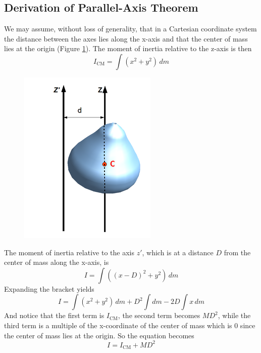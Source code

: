\subsection{Derivation of Parallel-Axis Theorem}
We may assume, without loss of generality, that in a Cartesian coordinate system the distance
between the axes lies along the x-axis and that the center of mass lies at the origin (Figure
\ref{fig:parallel-axis-theorem}). The moment of inertia relative to the z-axis is then
\[
    I_\text{CM}=\int(x^2+y^2)\,dm
\]
\begin{figure}[ht!]
    \centering
    \includegraphics[width=0.3 \textwidth]{../figures/parallel axis theorem.png}
    \caption{}
    \label{fig:parallel-axis-theorem}
\end{figure}
The moment of inertia relative to the axis $z'$, which is at a distance $D$ from the center of
mass along the x-axis, is
\[
    I=\int((x-D)^2+y^2)\,dm
\]
Expanding the bracket yields
\[
    I=\int(x^2+y^2)\,dm+D^2\int dm-2D\int x\,dm
\]
And notice that the first term is $I_\text{CM}$, the second term becomes $MD^2$, while the
third term is a multiple of the x-coordinate of the center of mass which is $0$ since the center of
mass lies at the origin. So the equation becomes
\[
    I=I_\text{CM}+MD^2
\]